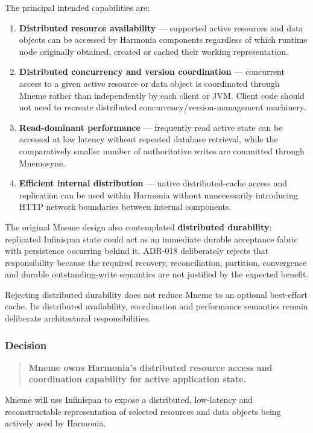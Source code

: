 The principal intended capabilities are:
\begin{enumerate}
    \item \textbf{Distributed resource availability} --- supported active resources and data objects can be accessed by Harmonia components regardless of which runtime node originally obtained, created or cached their working representation.
    \item \textbf{Distributed concurrency and version coordination} --- concurrent access to a given active resource or data object is coordinated through Mneme rather than independently by each client or JVM. Client code should not need to recreate distributed concurrency/version-management machinery.
    \item \textbf{Read-dominant performance} --- frequently read active state can be accessed at low latency without repeated database retrieval, while the comparatively smaller number of authoritative writes are committed through Mnemosyne.
    \item \textbf{Efficient internal distribution} --- native distributed-cache access and replication can be used within Harmonia without unnecessarily introducing HTTP network boundaries between internal components.
\end{enumerate}

The original Mneme design also contemplated \textbf{distributed durability}: replicated Infinispan state could act as an immediate durable acceptance fabric with persistence occurring behind it. ADR-018 deliberately rejects that responsibility because the required recovery, reconciliation, partition, convergence and durable outstanding-write semantics are not justified by the expected benefit.

Rejecting distributed durability does not reduce Mneme to an optional best-effort cache. Its distributed availability, coordination and performance semantics remain deliberate architectural responsibilities.

\subsubsection{Decision}

\begin{quote}
    \textbf{Mneme owns Harmonia's distributed resource access and coordination capability for active application state.}
\end{quote}

Mneme will use Infinispan to expose a distributed, low-latency and reconstructable representation of selected resources and data objects being actively used by Harmonia.

